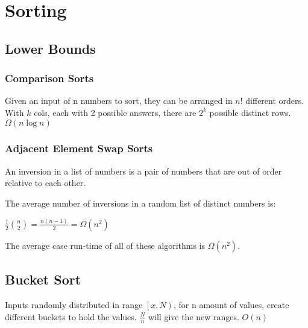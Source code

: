 \section{Sorting}
\subsection*{Lower Bounds}

\subsubsection*{Comparison Sorts}

Given an input of n numbers to sort, they can be arranged in $n!$ different orders.
With $k$ cols, each with 2 possible answers, there are $2^k$ possible distinct rows.
$\Omega(n\log n)$


\subsubsection*{Adjacent Element Swap Sorts}

An inversion in a list of numbers is a pair of numbers that are out of order relative to each other.

The average number of inversions in a random list of distinct numbers is:

$\frac{1}{2}\binom{n}{2}=\frac{n(n-1)}{2}=\Omega(n^2)$

The average case run-time of all of these algorithms is $\Omega(n^2)$.


\subsection*{Bucket Sort}
Inputs randomly distributed in range $\left[x,N\right)$, for n amount of values, create different buckets to hold the values. $\frac{N}{n}$ will give the new ranges. $O(n)$


